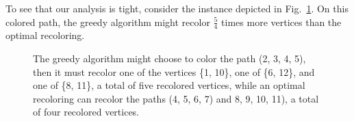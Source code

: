 To see that our analysis is tight, consider the instance depicted in
Fig.~\ref{fig:tight_path}. On this colored path, the greedy algorithm might
recolor $\frac{5}{4}$ times more vertices than the optimal recoloring.


\begin{figure}
\centering

\caption{
The greedy algorithm might choose to color the path (2, 3, 4, 5), 
then it must recolor one of the vertices \{1, 10\}, 
one of \{6, 12\}, 
and one of \{8, 11\}, 
a total of five recolored vertices,
while an optimal recoloring can recolor the paths (4, 5, 6, 7) and
8, 9, 10, 11), a total of four recolored vertices.}
\label{fig:tight_path}
\end{figure}
